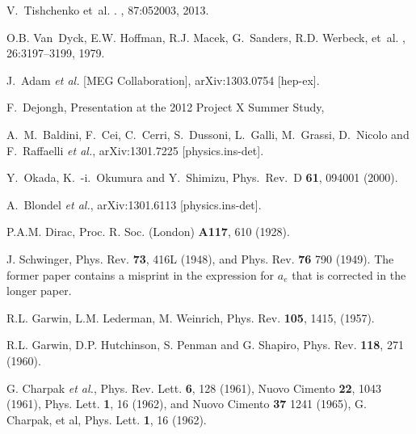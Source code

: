 \begin{thebibliography}{99}
V.~Tishchenko et~al.
.
, 87:052003, 2013.

O.B. Van~Dyck, E.W. Hoffman, R.J. Macek, G.~Sanders, R.D. Werbeck, et~al.
, 26:3197--3199, 1979.



  J.~Adam {\it et al.}  [MEG Collaboration],
  arXiv:1303.0754 [hep-ex].
  
F.~Dejongh, Presentation at the 2012 Project X Summer Study, \hfill{}

  A.~M.~Baldini, F.~Cei, C.~Cerri, S.~Dussoni, L.~Galli, M.~Grassi, D.~Nicolo and F.~Raffaelli {\it et al.},
  arXiv:1301.7225 [physics.ins-det].
 
    Y.~Okada, K.~-i.~Okumura and Y.~Shimizu, Phys.\ Rev.\ D {\bf 61}, 094001 (2000).
 
 A.~Blondel {\it et al.}, arXiv:1301.6113 [physics.ins-det].


 P.A.M. Dirac, Proc. R. Soc. (London) {\bf A117}, 610 (1928).


  J. Schwinger, Phys. Rev. {\bf 73}, 416L (1948), and
Phys. Rev. {\bf 76} 790 (1949). The former paper contains a misprint
in the expression for $a_e$ that is corrected in the longer paper.

 R.L. Garwin, L.M. Lederman, M. Weinrich,
Phys. Rev. {\bf 105}, 1415, (1957).

 R.L. Garwin, D.P. Hutchinson, S. Penman and G. Shapiro,
Phys. Rev. {\bf 118}, 271 (1960).

 G. Charpak {\it et al.},
 Phys. Rev. Lett. {\bf 6}, 128 (1961),
 Nuovo Cimento {\bf  22}, 1043 (1961),
 Phys. Lett. {\bf 1}, 16 (1962), and Nuovo Cimento {\bf 37} 1241 (1965),
 G. Charpak, et al,  Phys. Lett. {\bf 1}, 16 (1962).


\end{thebibliography}
